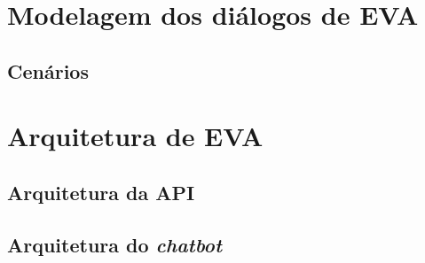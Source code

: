 
\section{Modelagem dos diálogos de EVA}

\subsection{Cenários}

\section{Arquitetura de EVA}

\subsection{Arquitetura da API}

\subsection{Arquitetura do \textit{chatbot}}